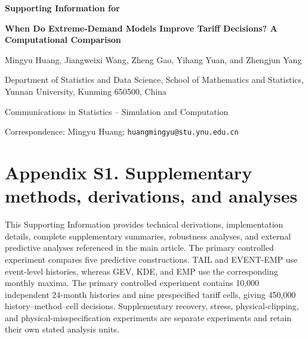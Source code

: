 \documentclass[]{interact}
\begin{document}

\begin{center}
\vspace*{0.12\textheight}

{\fontsize{11}{14}\selectfont\bfseries
Supporting Information for\par}

\vspace{8pt}

{\fontsize{18}{22}\selectfont\bfseries
When Do Extreme-Demand Models Improve Tariff Decisions?
A Computational Comparison\par}

\vspace{14pt}

{\fontsize{10}{13}\selectfont
Mingyu Huang, Jiangweixi Wang, Zheng Gao, Yihang Yuan, and Zhengjun Yang\par}

\vspace{4pt}

{\fontsize{9}{12}\selectfont
Department of Statistics and Data Science, School of Mathematics and Statistics, Yunnan University, Kunming 650500, China\par}

\vspace{10pt}

{\fontsize{9}{12}\selectfont
Communications in Statistics -- Simulation and Computation\par}

{\fontsize{9}{12}\selectfont Correspondence: Mingyu Huang; \texttt{huangmingyu@stu.ynu.edu.cn}\par}

\end{center}

\vfill
\clearpage
\resetlinenumber[1]\linenumbers



\section*{Appendix S1. Supplementary methods, derivations, and analyses}

This Supporting Information provides technical derivations,
implementation details, complete supplementary summaries, robustness
analyses, and external predictive analyses referenced in the main
article. The primary controlled experiment compares five predictive
constructions. TAIL and EVENT-EMP use event-level histories, whereas
GEV, KDE, and EMP use the corresponding monthly maxima. The primary controlled
experiment contains 10,000 independent 24-month histories and nine
prespecified tariff cells, giving 450,000
history--method--cell decisions. Supplementary recovery, stress,
physical-clipping, and physical-misspecification experiments are
separate experiments and retain their own stated analysis units.
\end{document}

